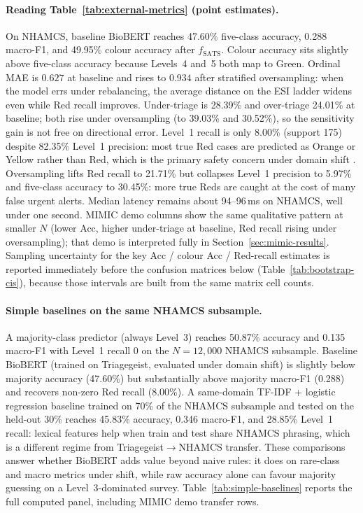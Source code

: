 \paragraph{Reading Table~\ref{tab:external-metrics} (point estimates).}
On NHAMCS, baseline BioBERT reaches 47.60\% five-class accuracy, 0.288 macro-F1, and 49.95\% colour accuracy after \(f_{\mathrm{SATS}}\). Colour accuracy sits slightly above five-class accuracy because Levels~4 and~5 both map to Green. Ordinal MAE is \(0.627\) at baseline and rises to \(0.934\) after stratified oversampling: when the model errs under rebalancing, the average distance on the ESI ladder widens even while Red recall improves. Under-triage is 28.39\% and over-triage 24.01\% at baseline; both rise under oversampling (to 39.03\% and 30.52\%), so the sensitivity gain is not free on directional error. Level~1 recall is only 8.00\% (support 175) despite 82.35\% Level~1 precision: most true Red cases are predicted as Orange or Yellow rather than Red, which is the primary safety concern under domain shift \citep{Berkowitz2019}. Oversampling lifts Red recall to 21.71\% but collapses Level~1 precision to 5.97\% and five-class accuracy to 30.45\%: more true Reds are caught at the cost of many false urgent alerts. Median latency remains about 94--96\,ms on NHAMCS, well under one second. MIMIC demo columns show the same qualitative pattern at smaller \(N\) (lower Acc, higher under-triage at baseline, Red recall rising under oversampling); that demo is interpreted fully in Section~\ref{sec:mimic-results}. Sampling uncertainty for the key Acc / colour Acc / Red-recall estimates is reported immediately before the confusion matrices below (Table~\ref{tab:bootstrap-cis}), because those intervals are built from the same matrix cell counts.

\paragraph{Simple baselines on the same NHAMCS subsample.}
A majority-class predictor (always Level~3) reaches 50.87\% accuracy and 0.135 macro-F1 with Level~1 recall \(0\) on the \(N=12{,}000\) NHAMCS subsample. Baseline BioBERT (trained on Triagegeist, evaluated under domain shift) is slightly below majority accuracy (47.60\%) but substantially above majority macro-F1 (0.288) and recovers non-zero Red recall (8.00\%). A same-domain TF-IDF + logistic regression baseline trained on 70\% of the NHAMCS subsample and tested on the held-out 30\% reaches 45.83\% accuracy, 0.346 macro-F1, and 28.85\% Level~1 recall: lexical features help when train and test share NHAMCS phrasing, which is a different regime from Triagegeist\(\rightarrow\)NHAMCS transfer. These comparisons answer whether BioBERT adds value beyond naive rules: it does on rare-class and macro metrics under shift, while raw accuracy alone can favour majority guessing on a Level~3-dominated survey. Table~\ref{tab:simple-baselines} reports the full computed panel, including MIMIC demo transfer rows.

